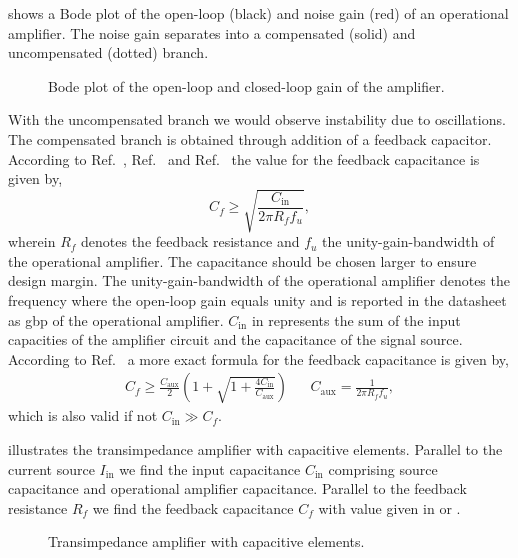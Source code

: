  shows a Bode plot of the open-loop (black) and noise gain (red) of an operational amplifier.
The noise gain separates into a compensated (solid) and uncompensated (dotted) branch.
\begin{figure}[H]
	\centering
	
	\caption{Bode plot of the open-loop and closed-loop gain of the amplifier.}\label{fig:bode_gain}
\end{figure}
With the uncompensated branch we would observe instability due to oscillations.
The compensated branch is obtained through addition of a feedback capacitor.
According to Ref.~\cite[p.~113]{Jung05}, Ref.~\cite[p.~693]{Hobbs11} and Ref.~\cite[Ch.~3]{Graeme96} the value for the feedback capacitance is given by,
\begin{equation}
	C_f\geq\sqrt{\frac{C_\text{in}}{2\pi R_f f_u}}
	\label{eq:feedback_capacitance_approximation},
\end{equation}
wherein $R_f$ denotes the feedback resistance and $f_u$ the unity-gain-bandwidth of the operational amplifier.
The capacitance should be chosen larger to ensure design margin.
The unity-gain-bandwidth of the operational amplifier denotes the frequency where the open-loop gain equals unity and is reported in the datasheet as \gls{gbp} of the operational amplifier.
$C_\text{in}$ in  represents the sum of the input capacities of the amplifier circuit and the capacitance of the signal source.
According to Ref.~\cite[p.~185]{Carter17} a more exact formula for the feedback capacitance is given by,
\begin{align}
	C_f\geq\frac{C_\text{aux}}{2}\left(1+\sqrt{1+\frac{4C_\text{in}}{C_\text{aux}}}\right) &&
	C_\text{aux}=\frac{1}{2\pi R_f f_u}
	\label{eq:feedback_capacitance_exact},
\end{align}
which is also valid if not $C_\text{in}\gg C_f$.

 illustrates the transimpedance amplifier with capacitive elements.
Parallel to the current source $I_\text{in}$ we find the input capacitance $C_\text{in}$ comprising source capacitance and operational amplifier capacitance.
Parallel to the feedback resistance $R_f$ we find the feedback capacitance $C_f$ with value given in  or .
\begin{figure}[H]
	\centering
	
	\caption{Transimpedance amplifier with capacitive elements.}\label{fig:capacitive_transimpedance}
\end{figure}

